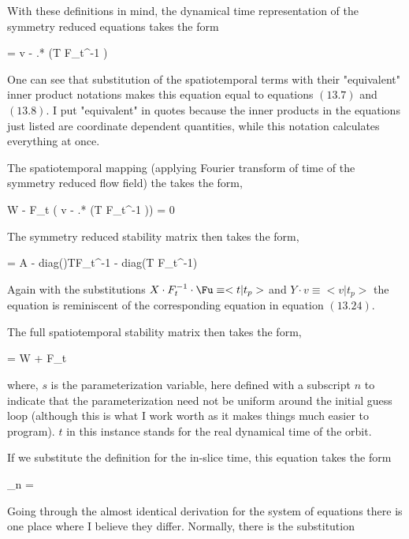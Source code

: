 With these definitions in mind, the dynamical time representation of the symmetry reduced
equations takes the form

\beq \label{MNGsymred_dyn_t}
 = v -  .* (T \cdot F_t^{-1} \cdot \Fu)
\eeq

One can see that substitution of the spatiotemporal
terms with their "equivalent" inner product notations makes this equation equal to
 equations $(13.7)$ and $(13.8)$. I put "equivalent" in quotes
because the inner products in the equations just listed are coordinate dependent
quantities, while this notation calculates everything at once.

The spatiotemporal mapping (applying Fourier transform of time of the symmetry reduced flow field)
the takes the form,

\beq
W \cdot \Fu - F_t \cdot( v -  .* (T \cdot F_t^{-1} \cdot \Fu)) = 0
\eeq

The symmetry reduced stability matrix then takes the form,

\beq
{} = A - diag()\cdot T\cdot F_t^{-1}
- diag(T \cdot F_t^{-1}\cdot \Fu) \cdot {}
\eeq

Again with the substitutions $X \cdot F^{-1}_t \cdot \Fu \equiv <t | t_p>$ and $Y \cdot v \equiv < v | t_p >$ the
equation is reminiscent of the corresponding equation in   equation $(13.24)$.

The full spatiotemporal stability matrix then takes the form,

\beq
{} = W + F_t \cdot {}
\eeq 

where, $s$ is the parameterization variable, here defined with a subscript $n$
to indicate that the parameterization need not be uniform around the initial guess
loop (although this is what I work worth as it makes things much easier to program).
$t$ in this instance stands for the real dynamical time of the orbit.

If we substitute the definition for the in-slice time, this equation takes the form

\beq
\lambda_n = 
\eeq

Going through the almost identical derivation for the system of equations there
is one place where I believe they differ. Normally, there is the substitution


